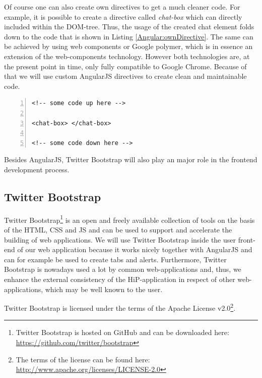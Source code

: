 Of course one can also create own directives to get a much cleaner code. For example, it is possible to create a directive called \textit{chat-box} which can directly included within the \ac{DOM}-tree. Thus, the usage of the created chat element folds down to the code that is shown in Listing \ref{Angular:ownDirective}. The same can be achieved by using web components or Google polymer, which is in essence an extension of the web-components technology. However both technologies are, at the present point in time, only fully compatible to Google Chrome. Because of that we will use custom AngularJS directives to create clean and maintainable code.

\begin{lstlisting}[numbers=left,caption={Simple example that shows the usage of a custom directive},label=Angular:ownDirective,frame=tlbr,breaklines]
<!-- some code up here -->

<chat-box> </chat-box>

<!-- some code down here -->
\end{lstlisting}

Besides AngularJS, Twitter Bootstrap will also play an major role in the frontend development process.
 
\subsection{Twitter Bootstrap}
Twitter Bootstrap\footnote{Twitter Bootstrap is hosted on GitHub and can be downloaded here: \url{https://github.com/twitter/bootstrap}} is an open and freely available collection of tools on the basis of the \ac{HTML}, \ac{CSS} and \ac{JS} and can be used to support and accelerate the building of web applications. We will use Twitter Bootstrap inside the user front-end of our web application because it works nicely together with AngularJS and can for example be used to create tabs and alerts. Furthermore, Twitter Bootstrap is nowadays used a lot by common web-applications and, thus, we enhance the external consistency  of the \ac{HiP}-application in respect of other web-applications, which may be well known to the user. 

Twitter Bootstrap is licensed under the terms of the Apache License v2.0\footnote{The terms of the license can be found here: \url{http://www.apache.org/licenses/LICENSE-2.0}}.

